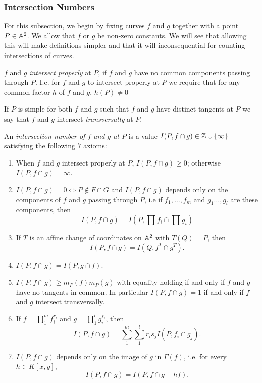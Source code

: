     \subsubsection{Intersection Numbers}\label{IntersectionNumber}
    For this subsection, we begin by fixing curves $f$ and $g$ together with a point $P\in \mathbb{A}^2$. We allow that $f$ or $g$ be non-zero constants. We will see that allowing this will make definitions simpler and that it will inconsequential for counting intersections of curves.  
    \begin{definition}
        $f$ and $g$ \textit{intersect properly} at $P$, if $f$ and $g$ have no common components passing through $P$. I.e. for $f$ and $g$ to intersect properly at $P$ we require that for any common factor $h$ of $f$ and $g$, $h(P)\neq 0$ 
    \end{definition}
    \begin{definition}
        If $P$ is simple for both $f$ and $g$ such that $f$ and $g$ have distinct tangents at $P$ we say that $f$ and $g$ intersect \textit{transversally} at $P$. 
    \end{definition}
    \begin{definition}
        An \textit{intersection number of $f$ and $g$ at $P$} is a value $I(P,f\cap g)\in \mathbb{Z}\cup \{\infty\}$ satisfying the following $7$ axioms:
        \begin{enumerate}
            \item When $f$ and $g$ intersect properly at $P$, $I(P,f\cap g)\geq 0$; otherwise $I(P,f\cap g)=\infty$.  
            \item $I(P,f\cap g) = 0 \iff P\notin F\cap G$ and $I(P,f\cap g)$ depends only on the components of $f$ and $g$ passing through $P$, i.e if $f_1,\dots,f_m$ and $g_1\dots,g_l$ are these components, then 
            $$I(P,f\cap g)=I\left(P,\prod f_i\cap \prod g_i\right)$$
            \item If $T$ is an affine change of coordinates on $\mathbb{A}^2$ with $T(Q)=P$, then 
            $$I(P,f\cap g)=I(Q,f^T\cap g^T).$$
            \item $I(P,f\cap g)=I(P,g\cap f)$. 
            \item $I(P,f\cap g) \geq m_P(f)m_P(g)$ with equality holding if and only if $f$ and $g$ have no tangents in common. In particular $I(P,f\cap g)=1$ if and only if $f$ and $g$ intersect transversally. 
            \item If $f=\prod_1^m f_i^{r_i}$ and $g=\prod_1^l g_i^{s_i}$, then 
            $$I(P,f\cap g)= \sum_{1}^m\sum_1^l r_is_jI(P,f_i\cap g_j).$$
            \item $I(P,f\cap g)$ depends only on the image of $g$ in $\Gamma(f)$, i.e. for every $h\in K[x,y]$,
            $$I(P,f\cap g)=I(P,f\cap g+hf).$$
        \end{enumerate}
    \end{definition}
